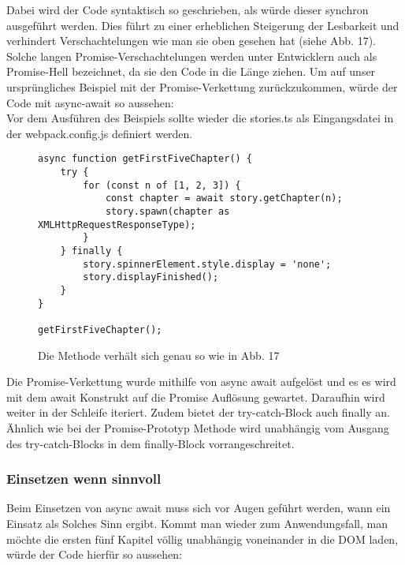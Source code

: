 \noindent
Dabei wird der Code syntaktisch so geschrieben, als würde dieser synchron ausgeführt werden. Dies führt zu einer erheblichen Steigerung der Lesbarkeit und verhindert Verschachtelungen wie man sie oben gesehen hat (siehe Abb. 17). Solche langen Promise-Verschachtelungen werden unter Entwicklern auch als \glqq{}Promise-Hell\grqq{} bezeichnet, da sie den Code in die Länge ziehen. Um auf unser ursprüngliches Beispiel mit der Promise-Verkettung zurückzukommen, würde der Code mit async-await so aussehen:\\

\noindent
Vor dem Ausführen des Beispiels sollte wieder die stories.ts als Eingangsdatei in der webpack.config.js definiert werden.

\begin{figure}[H]
\begin{lstlisting}
async function getFirstFiveChapter() {
    try {
        for (const n of [1, 2, 3]) {
            const chapter = await story.getChapter(n);
            story.spawn(chapter as XMLHttpRequestResponseType);
        }
    } finally {
        story.spinnerElement.style.display = 'none';
        story.displayFinished();
    }
}

getFirstFiveChapter();
\end{lstlisting}
\caption{Die Methode verhält sich genau so wie in Abb. 17}
\end{figure}

\noindent
Die Promise-Verkettung wurde mithilfe von async await aufgelöst und es es wird mit dem await Konstrukt auf die Promise Auflösung gewartet. Daraufhin wird weiter in der Schleife iteriert. Zudem bietet der try-catch-Block auch finally an. Ähnlich wie bei der Promise-Prototyp Methode wird unabhängig vom Ausgang des try-catch-Blocks in dem finally-Block vorrangeschreitet.

\subsubsection{Einsetzen wenn sinnvoll}

Beim Einsetzen von async await muss sich vor Augen geführt werden, wann ein Einsatz als Solches Sinn ergibt. Kommt man wieder zum Anwendungsfall, man möchte die ersten fünf Kapitel völlig unabhängig voneinander in die DOM laden, würde der Code hierfür so aussehen:

